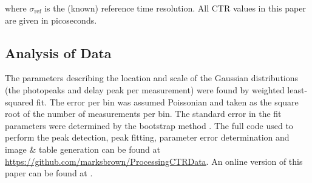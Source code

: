 where $\sigma_\text{ref}$ is the (known) reference time resolution. All CTR values in this paper are given in picoseconds.

\subsection{Analysis of Data}
The parameters describing the location and scale of the Gaussian distributions (the photopeaks and delay peak per measurement) were found by weighted least-squared fit. The error per bin was assumed Poissonian and taken as the square root of the number of measurements per bin. The standard error in the fit parameters were determined by the bootstrap method \cite{degroot2012probability}. The full code used to perform the peak detection, peak fitting, parameter error determination and image \& table generation can be found at \href{https://github.com/marksbrown/ProcessingCTRData}{https://github.com/marksbrown/ProcessingCTRData}. An online version of this paper can be found at \cite{Brown2014}.